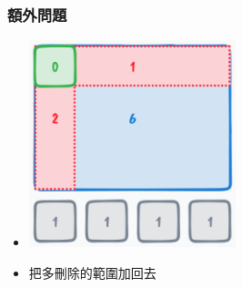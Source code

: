 \documentclass{beamer}
\begin{document}
\begin{frame}
    \frametitle{額外問題}
    \begin{itemize}
        \item \includegraphics[width=6.0cm]{img/img_14.png}
        \item 把多刪除的範圍加回去
    \end{itemize}
\end{frame}
\end{document}
